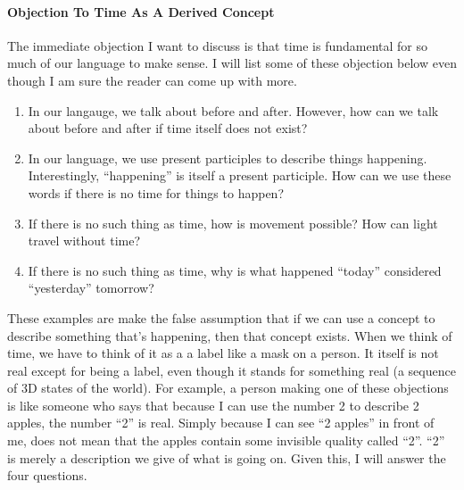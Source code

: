 \documentclass[a4paper, 12pt]{article}
\begin{document}
\paragraph{Objection To Time As A Derived Concept}
The immediate objection I want to discuss is that time is fundamental for so much of our language to make sense. I will list some of these objection below even though I am sure the reader can come up with more. \\
\begin{enumerate}
  \item In our langauge, we talk about before and after. However, how can we talk about before and after if time itself does not exist?
  \item In our language, we use present participles to describe things happening. Interestingly, ``happening'' is itself a present participle. How can we use these words if there is no time for things to happen?
  \item If there is no such thing as time, how is movement possible? How can light travel without time?
  \item If there is no such thing as time, why is what happened ``today'' considered ``yesterday'' tomorrow?
\end{enumerate}
These examples are make the false assumption that if we can use a concept to describe something that's happening, then that concept exists. When we think of time, we have to think of it as a a label like a mask on a person. It itself is not real except for being a label, even though it stands for something real (a sequence of 3D states of the world). For example, a person making one of these objections is like someone who says that because I can use the number 2 to describe 2 apples, the number ``2'' is real. Simply because I can see ``2 apples'' in front of me, does not mean that the apples contain some invisible quality called ``2''. ``2'' is merely a description we give of what is going on. Given this, I will answer the four questions. \\
\end{document}
